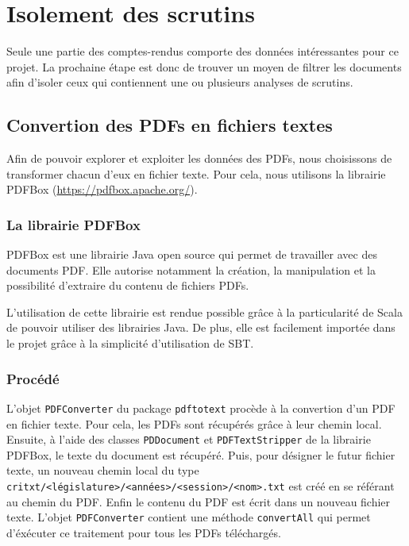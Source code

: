 \section{Isolement des scrutins}

Seule une partie des comptes-rendus comporte des données intéressantes pour ce projet. La prochaine étape est donc de trouver un moyen de filtrer les documents afin d'isoler ceux qui contiennent une ou plusieurs analyses de scrutins.

\subsection{Convertion des PDFs en fichiers textes}

Afin de pouvoir explorer et exploiter les données des PDFs, nous choisissons de transformer chacun d'eux en fichier texte. Pour cela, nous utilisons la librairie PDFBox (\url{https://pdfbox.apache.org/}).

\subsubsection{La librairie PDFBox}

PDFBox est une librairie Java open source qui permet de travailler avec des documents PDF. Elle autorise notamment la création, la manipulation et la possibilité d'extraire du contenu de fichiers PDFs.

L'utilisation de cette librairie est rendue possible grâce à la particularité de Scala de pouvoir utiliser des librairies Java. De plus, elle est facilement importée dans le projet grâce à la simplicité d'utilisation de SBT.

\subsubsection{Procédé}

L'objet \verb|PDFConverter| du package \verb|pdftotext| procède à la convertion d'un PDF en fichier texte.\newline
Pour cela, les PDFs sont récupérés grâce à leur chemin local. Ensuite, à l'aide des classes \verb|PDDocument| et \verb|PDFTextStripper| de la librairie PDFBox, le texte du document est récupéré. Puis, pour désigner le futur fichier texte, un nouveau chemin local du type  \verb|critxt/<législature>/<années>/<session>/<nom>.txt| est créé en se référant au chemin du PDF. Enfin le contenu du PDF est écrit dans un nouveau fichier texte. L'objet \verb|PDFConverter| contient une méthode \verb|convertAll| qui permet d'éxécuter ce traitement pour tous les PDFs téléchargés.

